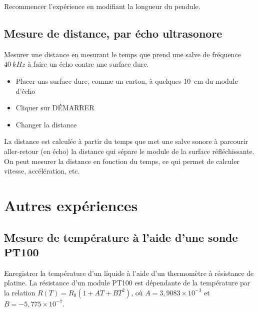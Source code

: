\documentclass[a4paper,12pt,french]{sphinxmanual}
\let\sphinxpxdimen\pdfpxdimen\else\newdimen\sphinxpxdimen
\begin{document}
Recommencer l’expérience en modifiant la longueur du pendule.


\section{Mesure de distance, par écho ultrasonore}
\label{\detokenize{6.4:mesure-de-distance-par-echo-ultrasonore}}\label{\detokenize{6.4::doc}}

Mesurer une distance en mesurant le temps que prend une salve de
fréquence \(40~kHz\) à faire un écho contre une surface dure.


\noindent\sphinxincludegraphics[width=300\sphinxpxdimen]{{sr04-dist}.pdf}
\begin{itemize}
\item {} 
Placer uns surface dure, comme un carton, à quelques 10 cm du module
d’écho

\item {} 
Cliquer sur DÉMARRER

\item {} 
Changer la distance

\end{itemize}


La distance est calculée à partir du temps que met une salve sonore à
parcourir aller-retour (en écho) la distance qui sépare le module de la
surface réfléchissante. On peut mesurer la distance en fonction du
temps, ce qui permet de calculer vitesse, accélération, etc.


\chapter{Autres expériences}
\label{\detokenize{index:autres-experiences}}

\section{Mesure de température à l’aide d’une sonde PT100}
\label{\detokenize{7.1:mesure-de-temperature-a-laide-dune-sonde-pt100}}\label{\detokenize{7.1::doc}}

Enregistrer la température d’un liquide à l’aide d’un thermomètre à
résistance de platine. La résistance d’un module PT100 est dépendante de
la température par la relation
\(R(T) = R_0 (1 + AT + BT^2)\), où
\(A = 3,9083 \times 10^{-3}\) et \(B =  - 5,775 \times 10^{-7}\).
\end{document}
